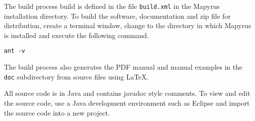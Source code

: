 The build process build is defined in the file \texttt{build.xml} in the
Mapyrus installation directory.  To build the software, documentation and zip
file for distribution, create a terminal window, change to the directory in
which Mapyrus is installed and execute the following command.

\begin{verbatim}
ant -v
\end{verbatim}

The build process also generates the PDF manual and manual examples in the
\texttt{doc} subdirectory from source files using \LaTeX.

All source code is in Java and contains javadoc style comments.  To view and
edit the source code, use a Java development environment such as Eclipse and
import the source code into a new project.

